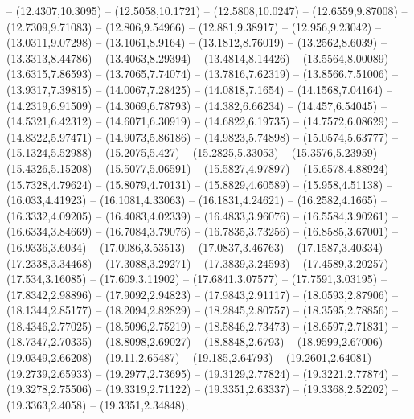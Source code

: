 {  -- (12.4307,10.3095) -- (12.5058,10.1721) -- (12.5808,10.0247) -- (12.6559,9.87008) -- (12.7309,9.71083) -- (12.806,9.54966) -- (12.881,9.38917) -- (12.956,9.23042) -- (13.0311,9.07298) -- (13.1061,8.9164) -- (13.1812,8.76019) -- (13.2562,8.6039) --
  (13.3313,8.44786) -- (13.4063,8.29394) -- (13.4814,8.14426) -- (13.5564,8.00089) -- (13.6315,7.86593) -- (13.7065,7.74074) -- (13.7816,7.62319) -- (13.8566,7.51006) -- (13.9317,7.39815) -- (14.0067,7.28425) -- (14.0818,7.1654) -- (14.1568,7.04164)
  -- (14.2319,6.91509) -- (14.3069,6.78793) -- (14.382,6.66234) -- (14.457,6.54045) -- (14.5321,6.42312) -- (14.6071,6.30919) -- (14.6822,6.19735) -- (14.7572,6.08629) -- (14.8322,5.97471) -- (14.9073,5.86186) -- (14.9823,5.74898) -- (15.0574,5.63777)
  -- (15.1324,5.52988) -- (15.2075,5.427) -- (15.2825,5.33053) -- (15.3576,5.23959) -- (15.4326,5.15208) -- (15.5077,5.06591) -- (15.5827,4.97897) -- (15.6578,4.88924) -- (15.7328,4.79624) -- (15.8079,4.70131) -- (15.8829,4.60589) -- (15.958,4.51138)
  -- (16.033,4.41923) -- (16.1081,4.33063) -- (16.1831,4.24621) -- (16.2582,4.1665) -- (16.3332,4.09205) -- (16.4083,4.02339) -- (16.4833,3.96076) -- (16.5584,3.90261) -- (16.6334,3.84669) -- (16.7084,3.79076) -- (16.7835,3.73256) -- (16.8585,3.67001)
  -- (16.9336,3.6034) -- (17.0086,3.53513) -- (17.0837,3.46763) -- (17.1587,3.40334) -- (17.2338,3.34468) -- (17.3088,3.29271) -- (17.3839,3.24593) -- (17.4589,3.20257) -- (17.534,3.16085) -- (17.609,3.11902) -- (17.6841,3.07577) -- (17.7591,3.03195)
  -- (17.8342,2.98896) -- (17.9092,2.94823) -- (17.9843,2.91117) -- (18.0593,2.87906) -- (18.1344,2.85177) -- (18.2094,2.82829) -- (18.2845,2.80757) -- (18.3595,2.78856) -- (18.4346,2.77025) -- (18.5096,2.75219) -- (18.5846,2.73473) --
  (18.6597,2.71831) -- (18.7347,2.70335) -- (18.8098,2.69027) -- (18.8848,2.6793) -- (18.9599,2.67006) -- (19.0349,2.66208) -- (19.11,2.65487) -- (19.185,2.64793) -- (19.2601,2.64081) -- (19.2739,2.65933) -- (19.2977,2.73695) -- (19.3129,2.77824) --
  (19.3221,2.77874) -- (19.3278,2.75506) -- (19.3319,2.71122) -- (19.3351,2.63337) -- (19.3368,2.52202) -- (19.3363,2.4058) -- (19.3351,2.34848);

}{

}
